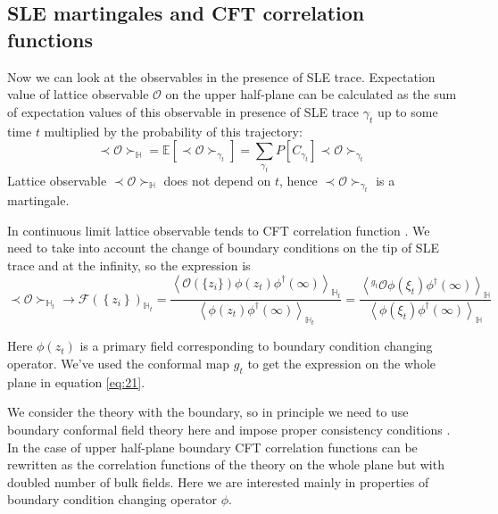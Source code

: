 \documentclass[a4paper]{jpconf}
\theoremstyle{definition}
\theoremstyle{definition} \newtheorem{Def}{Definition}
\begin{document}
\subsection{SLE martingales and CFT correlation functions}
\label{sec:corr-betw-sle}

Now we can look at the observables in the presence of SLE trace. Expectation value of lattice observable $\mathcal{O}$ on the upper half-plane can be calculated as the sum of expectation values of this observable in presence of SLE trace $\gamma_{t}$ up to some time $t$ multiplied by the probability of this trajectory:
\begin{equation*}
  \prec \mathcal{O} \succ_{\mathbb{H}}=\mathbb{E}\left[\prec\mathcal{O}\succ_{\gamma_{t}}\right]=\sum_{\gamma_{t}} P\left[C_{\gamma_{t}}\right] \prec \mathcal{O} \succ_{\gamma_{t}}
\end{equation*}
Lattice observable  $\prec \mathcal{O} \succ_{\mathbb{H}}$ does not depend on $t$, hence $\prec\mathcal{O}\succ_{\gamma_{t}}$ is a martingale.

In continuous limit lattice observable tends to CFT correlation function \cite{bauer2003sle,bauer2003conformal,bauer2002sle}.
We need to take into account the change of boundary conditions on the tip of SLE trace and at the infinity, so the expression is
\begin{equation}
  \prec \mathcal{O} \succ_{\mathbb{H}_{t}}\to \mathcal{F}(\left\{z_{i}\right\})_{\mathbb{H}_{t}}=
  \frac{\left< \mathcal{O}(\{z_{i}\})\phi(z_{t})\phi^{\dagger}(\infty)\right>_{\mathbb{H}_{t}}}{\left<\phi(z_{t})\phi^{\dagger}(\infty)\right>_{\mathbb{H}_{t}}}=
  \frac{\left< ^{g_{t}}\mathcal{O}\phi(\xi_{t})\phi^{\dagger}(\infty)\right>_{\mathbb{H}}}{\left<\phi(\xi_{t})\phi^{\dagger}(\infty)\right>_{\mathbb{H}}}
\label{eq:21}
\end{equation}

Here $\phi(z_{t})$ is a primary field corresponding to boundary condition changing operator. We've used the conformal map $g_{t}$ to get the expression on the whole plane in equation \eqref{eq:21}.

We consider the theory with the boundary, so in principle we need to use boundary conformal field theory here and impose proper consistency conditions \cite{cardy1984conformal,cardy1989boundary,cardy1991bulk}. In the case of upper half-plane boundary CFT correlation functions can be rewritten as the correlation functions of the theory on the whole plane but with doubled number of bulk fields. Here we are interested mainly in properties of boundary condition changing operator $\phi$. 
\end{document}
